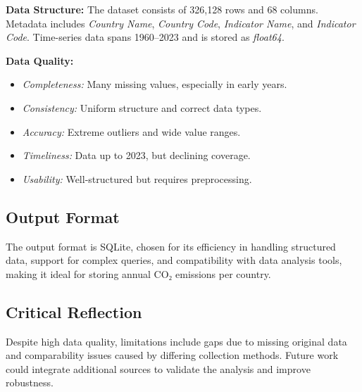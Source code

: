 \documentclass[a4paper,12pt]{article}
\begin{document}
\textbf{Data Structure:} The dataset consists of 326,128 rows and 68 columns. Metadata includes \textit{Country Name}, \textit{Country Code}, \textit{Indicator Name}, and \textit{Indicator Code}. Time-series data spans 1960--2023 and is stored as \textit{float64}.

\textbf{Data Quality:} 
\begin{itemize}
    \item \textit{Completeness:} Many missing values, especially in early years.
    \item \textit{Consistency:} Uniform structure and correct data types.
    \item \textit{Accuracy:} Extreme outliers and wide value ranges.
    \item \textit{Timeliness:} Data up to 2023, but declining coverage.
    \item \textit{Usability:} Well-structured but requires preprocessing.
\end{itemize}

\subsection{Output Format}

The output format is SQLite, chosen for its efficiency in handling structured data, support for complex queries, and compatibility with data analysis tools, making it ideal for storing annual CO₂ emissions per country.

\subsection{Critical Reflection}

Despite high data quality, limitations include gaps due to missing original data and comparability issues caused by differing collection methods. Future work could integrate additional sources to validate the analysis and improve robustness.
\end{document}
